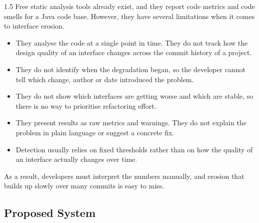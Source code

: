 \documentclass[12pt,a4paper]{article}
\begin{document}
\begin{spacing}{1.5}
\justifying
Free static analysis tools already exist, and they report code metrics and
code smells for a Java code base. However, they have several limitations
when it comes to interface erosion.

\begin{itemize}[leftmargin=*,itemsep=2pt]
  \item They analyse the code at a single point in time. They do not track
        how the design quality of an interface changes across the commit
        history of a project.
  \item They do not identify when the degradation began, so the developer
        cannot tell which change, author or date introduced the problem.
  \item They do not show which interfaces are getting worse and which are
        stable, so there is no way to prioritise refactoring effort.
  \item They present results as raw metrics and warnings. They do not
        explain the problem in plain language or suggest a concrete fix.
  \item Detection usually relies on fixed thresholds rather than on how
        the quality of an interface actually changes over time.
\end{itemize}

As a result, developers must interpret the numbers manually, and erosion
that builds up slowly over many commits is easy to miss.
\end{spacing}

\subsection{Proposed System}
\end{document}
